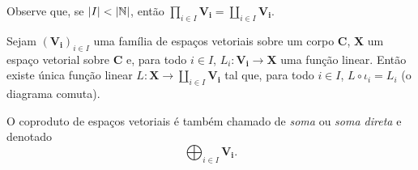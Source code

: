 Observe que, se $\left\lvert{I}\right\rvert < \left\lvert{\mathbb{N}}\right\rvert$, então $\prod_{i \in I} \bm{V_i} = \coprod_{i \in I} \bm{V_i}$.

\begin{proposition}
Sejam $(\bm{V_i})_{i \in I}$ uma família de espaços vetoriais sobre um corpo $\bm C$, $\bm X$ um espaço vetorial sobre $\bm C$ e, para todo $i \in I$, $L_i: \bm{V_i} \to \bm X$ uma função linear. Então existe única função linear $L: \bm X \to \coprod_{i \in I} \bm{V_i}$ tal que, para todo $i \in I$, $L \circ \iota_i = L_i$ (o diagrama comuta).
\begin{figure}
\centering
{}
\end{figure}
\end{proposition}

O coproduto de espaços vetoriais é também chamado de \emph{soma} ou \emph{soma direta} e denotado
	\begin{equation*}
	\bigoplus_{i \in I} \bm{V_i}.
	\end{equation*}



%
%
%
%




